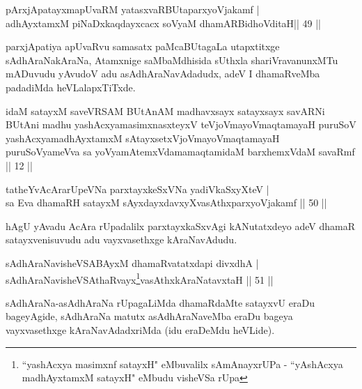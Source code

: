 \begin{shl}
pArxjApatayxmapUvaRM yatasxvaRBUtaparxyoVjakamf |\\
adhAyxtamxM piNaDxkaqdayxcacx soV\s yaM dhamARBidhoVditaH\hfill  || 49 ||
\end{shl}

\begin{artha}
parxjApatiya apUvaRvu samasatx paMcaBUtagaLa utapxtitxge
sAdhAraNakAraNa, Atamxnige saMbaMdhisida sUthxla shariVravanunxMTu
mADuvudu yAvudoV adu asAdhAraNavAdadudx, adeV I dhamaRveMba padadiMda heVLalapxTiTxde.
\end{artha}


\begin{kandikeshl}
idaM satayxM saveVRSAM BUtAnAM madhavxsayx satayxsayx savARNi BUtAni madhu yashAcxyamasimxnasxteyxV teVjoVmayoV\s maqtamayaH puruSoV yashAcxyamadhAyxtamxM sAtayxsetxVjoVmayoV\s maqtamayaH puruSoV\s yameVva sa yoV\s yamAtemxVdamamaqtamidaM barxhemxVdaM savaRmf || 12 ||
\end{kandikeshl}


\begin{shl}
tatheYvA\s \s cArarUpeVNa parxtayxkeSxVNa yadiVkaSxyXteV |\\
sa Eva  dhamaRH satayxM sAyxdayxdavxyXvasAthxparxyoVjakamf \hfill || 50 ||
\end{shl}

\begin{artha}
hAgU yAvadu AcAra rUpadalilx parxtayxkaSxvAgi kANutatxdeyo adeV dhamaR satayxvenisuvudu adu vayxvasethxge kAraNavAdudu.
\end{artha}


\begin{shl}
sAdhAraNavisheVSABAyxM dhamaRvatatxdapi divxdhA |\\
sAdhAraNavisheVSAthaRvayx\footnote{``yashAcxya masimxnf satayxH" eMbuvalilx sAmAnayxrUPa - ``yAshAcxya madhAyxtamxM satayxH" eMbudu visheVSa rUpa}vasAthxkAraNatavxtaH \hfill || 51 ||
\end{shl}

\begin{artha}
sAdhAraNa-asAdhAraNa rUpagaLiMda dhamaRdaMte satayxvU eraDu bageyAgide, sAdhAraNa matutx asAdhAraNaveMba eraDu bageya vayxvasethxge kAraNavAdadxriMda (idu eraDeMdu heVLide).
\end{artha}

